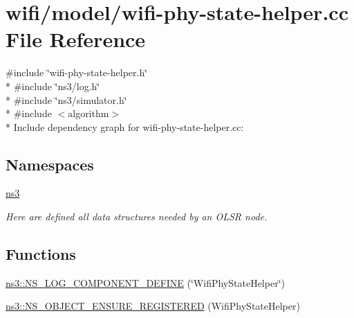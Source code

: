 \hypertarget{wifi-phy-state-helper_8cc}{}\section{wifi/model/wifi-\/phy-\/state-\/helper.cc File Reference}
\label{wifi-phy-state-helper_8cc}
{\ttfamily \#include \char`\"{}wifi-\/phy-\/state-\/helper.\+h\char`\"{}}\\*
{\ttfamily \#include \char`\"{}ns3/log.\+h\char`\"{}}\\*
{\ttfamily \#include \char`\"{}ns3/simulator.\+h\char`\"{}}\\*
{\ttfamily \#include $<$algorithm$>$}\\*
Include dependency graph for wifi-\/phy-\/state-\/helper.cc\+:
\subsection*{Namespaces}
\begin{DoxyCompactItemize}
\item 
 \hyperlink{namespacens3}{ns3}
\begin{DoxyCompactList}\small\item\em Here are defined all data structures needed by an O\+L\+SR node. \end{DoxyCompactList}\end{DoxyCompactItemize}
\subsection*{Functions}
\begin{DoxyCompactItemize}
\item 
\hyperlink{namespacens3_afdddb265f2426ee9d4dbfdbda5155cbe}{ns3\+::\+N\+S\+\_\+\+L\+O\+G\+\_\+\+C\+O\+M\+P\+O\+N\+E\+N\+T\+\_\+\+D\+E\+F\+I\+NE} (\char`\"{}Wifi\+Phy\+State\+Helper\char`\"{})
\item 
\hyperlink{namespacens3_a82521f544286142a84d2c4040f8af39a}{ns3\+::\+N\+S\+\_\+\+O\+B\+J\+E\+C\+T\+\_\+\+E\+N\+S\+U\+R\+E\+\_\+\+R\+E\+G\+I\+S\+T\+E\+R\+ED} (Wifi\+Phy\+State\+Helper)
\end{DoxyCompactItemize}
